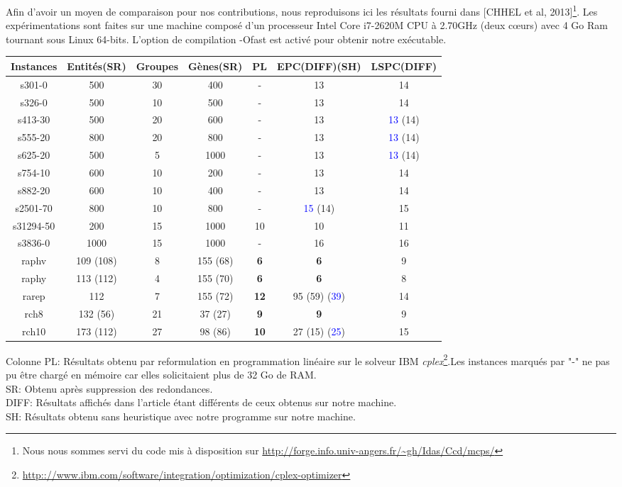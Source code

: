 \documentclass[a4paper,10pt]{article}
\begin{document}
Afin d'avoir un moyen de comparaison pour nos contributions, nous reproduisons ici les résultats fourni dans [CHHEL et al, 2013]\footnote{Nous nous sommes servi du code mis à disposition sur \url{http://forge.info.univ-angers.fr/~gh/Idas/Ccd/mcps/}}. Les expérimentations sont faites sur une machine composé d'un processeur Intel Core i7-2620M CPU à 2.70GHz (deux cœurs) avec 4 Go Ram tournant sous Linux 64-bits. L'option de compilation -Ofast est activé pour obtenir notre exécutable.
\begin{center}
\begin{tabular}{|c|c|c|c|c|c|c|}
\hline 
Instances & Entités(SR) & Groupes & Gènes(SR) & PL & EPC(DIFF)(SH) & LSPC(DIFF) \\ 
\hline 
s301-0 & 500 & 30 & 400 & - & 13 & 14 \\ 
\hline 
s326-0 & 500 & 10 & 500 & - & 13 & 14 \\ 
\hline 
s413-30 & 500 & 20 & 600 & - & 13 & \textcolor{blue}{13} (14) \\ 
\hline 
s555-20 & 800 & 20 & 800 & - & 13 & \textcolor{blue}{13} (14) \\ 
\hline 
s625-20 & 500 & 5 & 1000 & - & 13 & \textcolor{blue}{13} (14) \\ 
\hline 
s754-10 & 600 & 10 & 200 & - & 13 & 14 \\ 
\hline 
s882-20 & 600 & 10 & 400 & - & 13 & 14 \\ 
\hline 
s2501-70 & 800 & 10 & 800 & - & \textcolor{blue}{15} (14) & 15 \\ 
\hline 
s31294-50 & 200 & 15 & 1000 & 10 & 10 & 11 \\ 
\hline 
s3836-0 & 1000 & 15 & 1000 & - & 16 & 16 \\ 
\hline 
raphv & 109 (108) & 8 & 155 (68) & \textbf{6} & \textbf{6} & 9 \\ 
\hline 
raphy & 113 (112) & 4 & 155 (70) & \textbf{6} & \textbf{6} & 8 \\ 
\hline 
rarep & 112 & 7 & 155 (72) & \textbf{12} & 95 (59) (\textcolor{blue}{39}) & 14 \\ 
\hline 
rch8 & 132 (56) & 21 & 37 (27) & \textbf{9} & \textbf{9} & 9 \\ 
\hline 
rch10 & 173 (112) & 27 & 98 (86) & \textbf{10} & 27 (15) (\textcolor{blue}{25}) & 15 \\ 
\hline 
\end{tabular} 
\end{center}
Colonne PL: Résultats obtenu par reformulation en programmation linéaire sur le solveur IBM \textit{cplex}\footnote{\url{http:://www.ibm.com/software/integration/optimization/cplex-optimizer}}.Les instances marqués par "-" ne pas pu être chargé en mémoire car elles solicitaient plus de 32 Go de RAM.\\
SR: Obtenu après suppression des redondances.\\
DIFF: Résultats affichés dans l'article étant différents de ceux obtenus sur notre machine.\\
SH: Résultats obtenu sans heuristique avec notre programme sur notre machine.\\
\end{document}
